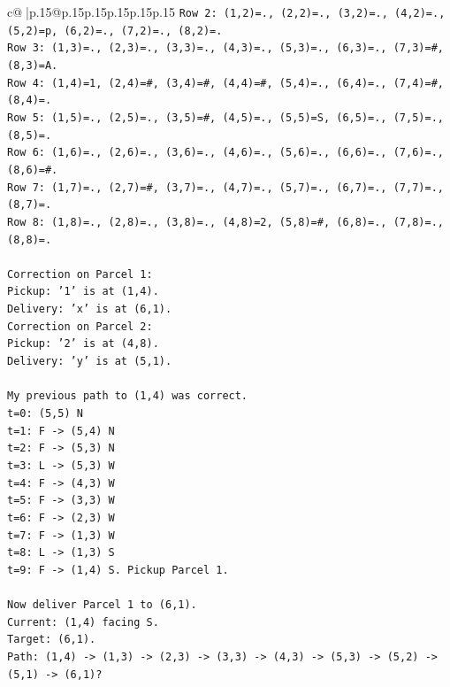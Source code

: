 \documentclass{article}
\begin{document}
{\begin{supertabular}{c@{$\;$}|p{.15\linewidth}@{}p{.15\linewidth}p{.15\linewidth}p{.15\linewidth}p{.15\linewidth}p{.15\linewidth}}
{{{\texttt{Row 2: (1,2)=., (2,2)=., (3,2)=., (4,2)=., (5,2)=p, (6,2)=., (7,2)=., (8,2)=.} \\
\texttt{Row 3: (1,3)=., (2,3)=., (3,3)=., (4,3)=., (5,3)=., (6,3)=., (7,3)=\#, (8,3)=A.} \\
\texttt{Row 4: (1,4)=1, (2,4)=\#, (3,4)=\#, (4,4)=\#, (5,4)=., (6,4)=., (7,4)=\#, (8,4)=.} \\
\texttt{Row 5: (1,5)=., (2,5)=., (3,5)=\#, (4,5)=., (5,5)=S, (6,5)=., (7,5)=., (8,5)=.} \\
\texttt{Row 6: (1,6)=., (2,6)=., (3,6)=., (4,6)=., (5,6)=., (6,6)=., (7,6)=., (8,6)=\#.} \\
\texttt{Row 7: (1,7)=., (2,7)=\#, (3,7)=., (4,7)=., (5,7)=., (6,7)=., (7,7)=., (8,7)=.} \\
\texttt{Row 8: (1,8)=., (2,8)=., (3,8)=., (4,8)=2, (5,8)=\#, (6,8)=., (7,8)=., (8,8)=.} \\
\\ 
\texttt{Correction on Parcel 1:} \\
\texttt{Pickup: '1' is at (1,4).} \\
\texttt{Delivery: 'x' is at (6,1).} \\
\texttt{Correction on Parcel 2:} \\
\texttt{Pickup: '2' is at (4,8).} \\
\texttt{Delivery: 'y' is at (5,1).} \\
\\ 
\texttt{My previous path to (1,4) was correct.} \\
\texttt{t=0: (5,5) N} \\
\texttt{t=1: F {-}> (5,4) N} \\
\texttt{t=2: F {-}> (5,3) N} \\
\texttt{t=3: L {-}> (5,3) W} \\
\texttt{t=4: F {-}> (4,3) W} \\
\texttt{t=5: F {-}> (3,3) W} \\
\texttt{t=6: F {-}> (2,3) W} \\
\texttt{t=7: F {-}> (1,3) W} \\
\texttt{t=8: L {-}> (1,3) S} \\
\texttt{t=9: F {-}> (1,4) S. Pickup Parcel 1.} \\
\\ 
\texttt{Now deliver Parcel 1 to (6,1).} \\
\texttt{Current: (1,4) facing S.} \\
\texttt{Target: (6,1).} \\
\texttt{Path: (1,4) {-}> (1,3) {-}> (2,3) {-}> (3,3) {-}> (4,3) {-}> (5,3) {-}> (5,2) {-}> (5,1) {-}> (6,1)?} \\
}}}
\end{supertabular}}
\end{document}
